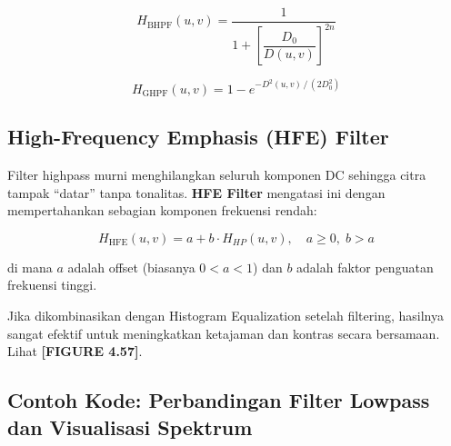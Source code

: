 \documentclass[12pt,a4paper]{article}
\begin{document}
\begin{equation}
  H_{\mathrm{BHPF}}(u,v) = \frac{1}{1 + \left[\dfrac{D_0}{D(u,v)}\right]^{2n}}
  \label{eq:bhpf}
\end{equation}

\begin{equation}
  H_{\mathrm{GHPF}}(u,v) = 1 - e^{-D^2(u,v)\,/\,(2D_0^2)}
  \label{eq:ghpf}
\end{equation}

\subsection{High-Frequency Emphasis (HFE) Filter}

Filter highpass murni menghilangkan seluruh komponen DC sehingga citra tampak
``datar'' tanpa tonalitas. \textbf{HFE Filter} mengatasi ini dengan
mempertahankan sebagian komponen frekuensi rendah:

\begin{equation}
  H_{\mathrm{HFE}}(u,v) = a + b \cdot H_{HP}(u,v), \quad a \geq 0,\; b > a
  \label{eq:hfe}
\end{equation}

di mana $a$ adalah offset (biasanya $0 < a < 1$) dan $b$ adalah faktor
penguatan frekuensi tinggi.

\begin{notebox}
Jika dikombinasikan dengan Histogram Equalization setelah filtering, hasilnya
sangat efektif untuk meningkatkan ketajaman dan kontras secara bersamaan.
Lihat \textbf{[FIGURE 4.57]}.
\end{notebox}

\subsection{Contoh Kode: Perbandingan Filter Lowpass dan Visualisasi Spektrum}
\end{document}
